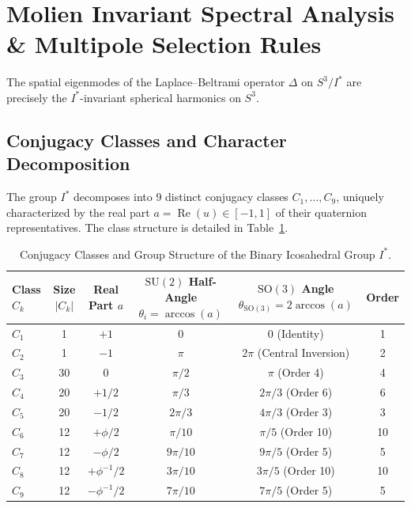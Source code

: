 \documentclass[11pt,a4paper]{article}
\theoremstyle{definition}
\newcommand{\SO}{\mathrm{SO}}
\newcommand{\SU}{\mathrm{SU}}
\begin{document}
\section{Molien Invariant Spectral Analysis \& Multipole Selection Rules}

The spatial eigenmodes of the Laplace--Beltrami operator $\Delta$ on $S^3 / I^*$ are precisely the $I^*$-invariant spherical harmonics on $S^3$.

\subsection{Conjugacy Classes and Character Decomposition}

The group $I^*$ decomposes into 9 distinct conjugacy classes $C_1, \dots, C_9$, uniquely characterized by the real part $a = \operatorname{Re}(u) \in [-1, 1]$ of their quaternion representatives. The class structure is detailed in Table~\ref{tab:conjugacy}.

\begin{table}[htbp]
\centering
\caption{Conjugacy Classes and Group Structure of the Binary Icosahedral Group $I^*$.}
\label{tab:conjugacy}
\vspace{0.4em}
\begin{tabular}{lccccc}
\toprule
\textbf{Class $C_k$} & \textbf{Size $|C_k|$} & \textbf{Real Part $a$} & \textbf{$\SU(2)$ Half-Angle $\theta_i = \arccos(a)$} & \textbf{$\SO(3)$ Angle $\theta_{\SO(3)} = 2\arccos(a)$} & \textbf{Order} \\
\midrule
$C_1$ & 1 & $+1$ & $0$ & $0$ (Identity) & 1 \\
$C_2$ & 1 & $-1$ & $\pi$ & $2\pi$ (Central Inversion) & 2 \\
$C_3$ & 30 & $0$ & $\pi/2$ & $\pi$ (Order 4) & 4 \\
$C_4$ & 20 & $+1/2$ & $\pi/3$ & $2\pi/3$ (Order 6) & 6 \\
$C_5$ & 20 & $-1/2$ & $2\pi/3$ & $4\pi/3$ (Order 3) & 3 \\
$C_6$ & 12 & $+\phi/2$ & $\pi/10$ & $\pi/5$ (Order 10) & 10 \\
$C_7$ & 12 & $-\phi/2$ & $9\pi/10$ & $9\pi/5$ (Order 5) & 5 \\
$C_8$ & 12 & $+\phi^{-1}/2$ & $3\pi/10$ & $3\pi/5$ (Order 10) & 10 \\
$C_9$ & 12 & $-\phi^{-1}/2$ & $7\pi/10$ & $7\pi/5$ (Order 5) & 5 \\
\bottomrule
\end{tabular}
\end{table}
\end{document}
